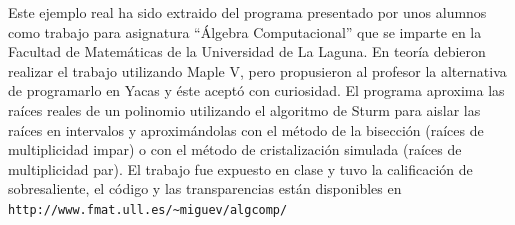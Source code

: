 Este ejemplo  real ha sido  extraido del programa presentado  por unos
alumnos como trabajo para  asignatura ``Álgebra Computacional'' que se
imparte en la Facultad de Matemáticas  de la Universidad de La Laguna.
En  teoría  debieron realizar  el  trabajo  utilizando Maple  V,  pero
propusieron al profesor la alternativa  de programarlo en Yacas y éste
aceptó con  curiosidad. El programa  aproxima las raíces reales  de un
polinomio utilizando el  algoritmo de Sturm para aislar  las raíces en
intervalos y aproximándolas  con el método de la  bisección (raíces de
multiplicidad  impar)  o  con  el método  de  cristalización  simulada
(raíces de multiplicidad par). El trabajo fue expuesto en clase y tuvo
la calificación de sobresaliente, el código y las transparencias están
disponibles en {\tt http://www.fmat.ull.es/\~{}miguev/algcomp/}

